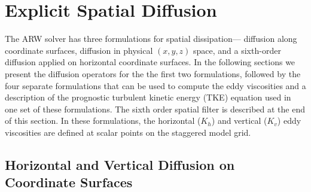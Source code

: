 \section{Explicit Spatial Diffusion}

The ARW solver has three formulations for spatial dissipation--- diffusion
along coordinate surfaces, diffusion in physical $(x,y,z)$ space, and 
a sixth-order diffusion applied on horizontal coordinate surfaces.  In
the following sections we present the diffusion operators for the the
first two
formulations, followed by the four separate formulations that can be
used to compute the eddy viscosities and a description of
the prognostic turbulent kinetic energy (TKE) equation used in one set
of these formulations.  The sixth order spatial filter is described at
the end of this section. In these formulations, the horizontal ($K_h$) and
vertical ($K_v$) eddy viscosities are defined at scalar points on the 
staggered model grid. 

\subsection{Horizontal and Vertical Diffusion on Coordinate Surfaces}

